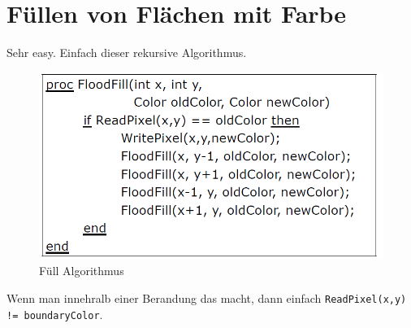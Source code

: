 \section{Füllen von Flächen mit Farbe}
Sehr easy. Einfach dieser rekursive Algorithmus.
\begin{figure}[!ht]
	\centering
	\includegraphics[width=0.4\linewidth]{fig/flaeche_fill}
	\caption{Füll Algorithmus}
	\label{flaeche_fill}
\end{figure}
Wenn man innehralb einer Berandung das macht, dann einfach \texttt{ReadPixel(x,y) != boundaryColor}.

